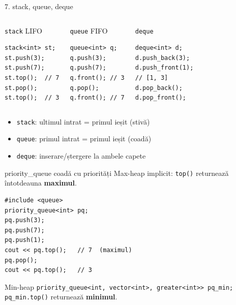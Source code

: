 ﻿\documentclass{beamer}
\begin{document}
\begin{frame}[fragile]{7. stack, queue, deque}
  \begin{columns}[T]
    \begin{block}{\texttt{stack} \textemdash{} LIFO}
      \begin{lstlisting}
stack<int> st;
st.push(3);
st.push(7);
st.top();  // 7
st.pop();
st.top();  // 3
      \end{lstlisting}
    \end{block}

    \begin{block}{\texttt{queue} \textemdash{} FIFO}
      \begin{lstlisting}
queue<int> q;
q.push(3);
q.push(7);
q.front(); // 3
q.pop();
q.front(); // 7
      \end{lstlisting}
    \end{block}

    \begin{block}{\texttt{deque}}
      \begin{lstlisting}
deque<int> d;
d.push_back(3);
d.push_front(1);
// [1, 3]
d.pop_back();
d.pop_front();
      \end{lstlisting}
    \end{block}
  \end{columns}

  \smallskip
  \begin{itemize}\footnotesize\itemsep0pt
    \item \texttt{stack}: ultimul intrat = primul ieșit (stivă)
    \item \texttt{queue}: primul intrat = primul ieșit (coadă)
    \item \texttt{deque}: inserare/ștergere la ambele capete
  \end{itemize}
\end{frame}

\begin{frame}[fragile]{priority\_queue \textemdash{} coadă cu priorități}
  Max-heap implicit: \texttt{top()} returnează întotdeauna \textbf{maximul}.

  \begin{lstlisting}
#include <queue>
priority_queue<int> pq;
pq.push(3);
pq.push(7);
pq.push(1);
cout << pq.top();   // 7  (maximul)
pq.pop();
cout << pq.top();   // 3
  \end{lstlisting}

  \begin{block}{Min-heap}
    \texttt{priority\_queue<int, vector<int>, greater<int>> pq\_min;} \\
    \texttt{pq\_min.top()} returnează \textbf{minimul}.
  \end{block}
\end{frame}
\end{document}
